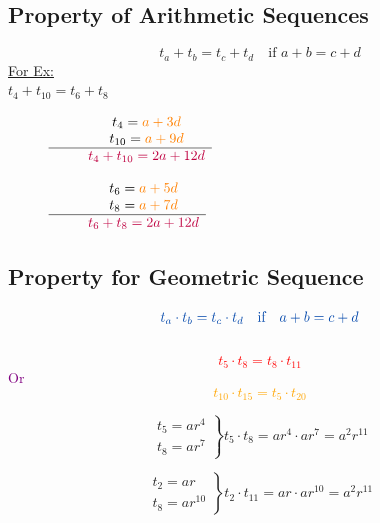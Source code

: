 \documentclass[12pt,a4paper]{article}
\begin{document}
\subsection*{Property of Arithmetic Sequences}
\begin{equation*}
    t_a+t_b=t_c+t_d \quad \text{if } a+b=c+d
\end{equation*}
\underline{For Ex:} \\
$t_4+t_{10}=t_6+t_8$
\begin{figure}[ht]
\begin{minipage}{0.45\textwidth}
    \centering
    $\begin{array}{ccccc}
        & \quad t_4 = \textcolor{orange}{a+3d} \\
        & \quad t_{10} = \textcolor{orange}{a+9d} \\
        \hline \
        & \quad \textcolor{purple}{t_4+t_{10}=2a+12d}
    \end{array}$
\end{minipage}
\hfill
\begin{minipage}{0.45\textwidth}
    \centering
    $\begin{array}{ccccc}
        & \quad t_6 = \textcolor{orange}{a+5d} \\
        & \quad t_8 = \textcolor{orange}{a+7d} \\
        \hline \
        & \quad \textcolor{purple}{t_6+t_8=2a+12d}
    \end{array}$
\end{minipage}
\end{figure}
\subsection*{Property for Geometric Sequence}

\begin{minipage}[t]{0.5\linewidth}\raggedright
    \begin{equation*}
        \textcolor{blue}{t_a \cdot t_b = t_c \cdot t_d \quad \text{if} \quad a+b=c+d}
    \end{equation*}
    \text{\underline{For Ex:}}\\
    \textcolor{red}{\[t_5 \cdot t_8 = t_8 \cdot t_{11}\]}
    \textcolor{purple}{Or}
    \textcolor{orange}{\[t_{10} \cdot t_{15} = t_{5} \cdot t_{20}\]}
\end{minipage}%
\begin{minipage}[t]{0.3\linewidth}\raggedright
\[
\left.\begin{matrix}
    t_5=ar^4\\
    t_8=ar^7
\end{matrix}\right\}t_5\cdot t_8=ar^4\cdot ar^7=a^2r^{11}
\]


\[
\left.\begin{matrix}
    t_2=ar\\
    t_8=ar^{10}
\end{matrix}\right\}t_2\cdot t_{11}=ar\cdot ar^{10}=a^2r^{11}
\]
    
\end{minipage}
\end{document}
